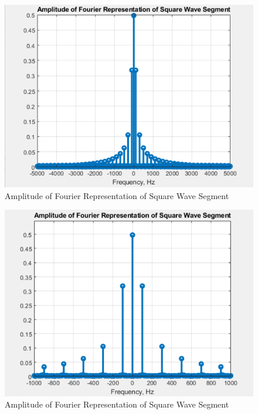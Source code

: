 \documentclass[
	letterpaper, %
	10pt, %
]{CSUniSchoolLabReport}
\begin{document}
\begin{figure}[h!]
  \centering
  \includegraphics[width=.9\textwidth]{Figures/L13Q1-4.png}
  \caption{Amplitude of Fourier Representation of Square Wave Segment}
  \label{fig:4}
\end{figure}

\begin{figure}[h!]
  \centering
  \includegraphics[width=.9\textwidth]{Figures/L13Q1-5.png}
  \caption{Amplitude of Fourier Representation of Square Wave Segment}
  \label{fig:5}
\end{figure}
\end{document}
